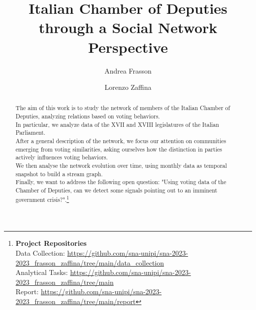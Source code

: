 \documentclass[sigchi]{acmart}
\begin{document}
%
\title{Italian Chamber of Deputies \\ through a Social Network Perspective}

\author{Andrea Frasson}

\author{Lorenzo Zaffina}



\renewcommand{\shortauthors}{Frasson and Zaffina}


\begin{abstract}

The aim of this work is to study the network of members of the Italian Chamber of Deputies, analyzing relations based on voting behaviors. \\
In particular, we analyze data of the XVII and XVIII legislatures of the Italian Parliament.\\

After a general description of the network, we focus our attention on communities emerging from voting similarities, asking ourselves how the distinction in parties actively influences voting behaviors.\\
We then analyse the network evolution over time, using monthly data as temporal snapshot to build a stream graph.\\
Finally, we want to address the following open question: "Using voting data of the Chamber of Deputies, can we detect some signals pointing out to an imminent government crisis?".\footnote{
{\bf Project Repositories}\\
\noindent Data Collection: \url{https://github.com/sna-unipi/sna-2023-2023_frasson_zaffina/tree/main/data_collection}\\
\noindent Analytical Tasks: \url{https://github.com/sna-unipi/sna-2023-2023_frasson_zaffina/tree/main}\\
\noindent Report: \url{https://github.com/sna-unipi/sna-2023-2023_frasson_zaffina/tree/main/report}}
\end{abstract}
\end{document}
